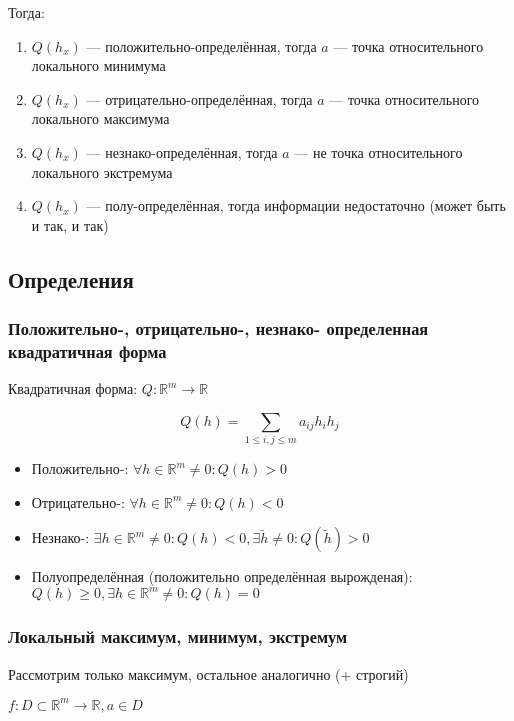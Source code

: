 \documentclass{article}
\begin{document}
Тогда: 

\begin{enumerate}
    \item $Q(h_x)$ --- положительно-определённая, тогда $a$ --- точка относительного локального минимума
    \item $Q(h_x)$ --- отрицательно-определённая, тогда $a$ --- точка относительного локального максимума
    \item $Q(h_x)$ --- незнако-определённая, тогда $a$ --- не точка относительного локального экстремума
    \item $Q(h_x)$ --- полу-определённая, тогда информации недостаточно (может быть и так, и так)
\end{enumerate}

\newpage

\subsection{Определения}

\subsubsection{Положительно-, отрицательно-, незнако- определенная квадратичная форма}

Квадратичная форма: $Q: \mathbb{R}^m \rightarrow \mathbb{R}$

\[Q(h) = \sum_{1 \le i, j \le m}{a_{ij}h_i h_j}\]


\begin{itemize}
    \item Положительно-: $\forall h \in \mathbb{R}^m \neq 0: Q(h) > 0$
    \item Отрицательно-: $\forall h \in \mathbb{R}^m \neq 0: Q(h) < 0$
    \item Незнако-: $\exists h \in \mathbb{R}^m \neq 0: Q(h) < 0, \exists \widetilde{h} \neq 0: Q(\widetilde{h}) > 0$
    \item Полуопределённая (положительно определённая вырожденая): $Q(h) \ge 0, \exists h \in \mathbb{R}^m \neq 0: Q(h) = 0$

\end{itemize}

\subsubsection{Локальный максимум, минимум, экстремум}
Рассмотрим только максимум, остальное аналогично (+ строгий)

$f: D \subset \mathbb{R}^m \rightarrow \mathbb{R}, a \in D$
\end{document}
